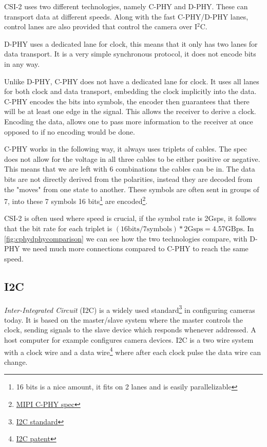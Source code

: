 CSI-2 uses two different technologies, namely C-PHY and D-PHY. These can
transport data at different speeds. Along with the fast C-PHY/D-PHY lanes,
control lanes are also provided that control the camera over I$^2$C.

D-PHY uses a dedicated lane for clock, this means that it only has two lanes for
data transport. It is a very simple synchronous protocol, it does not encode
bits in any way.

Unlike D-PHY, C-PHY does not have a dedicated lane for clock. It uses all lanes
for both clock and data transport, embedding the clock implicitly into the
data. C-PHY encodes the bits into symbols, the encoder then guarantees that
there will be at least one edge in the signal. This allows the receiver to
derive a clock. Encoding the data, allows one to pass more information to the
receiver at once opposed to if no encoding would be done.

C-PHY works in the following way, it always uses triplets of cables. The spec
does not allow for the voltage in all three cables to be either positive or
negative. This means that we are left with 6 combinations the cables can be in.
The data bits are not directly derived from the polarities, instead they are
decoded from the "moves" from one state to another. These symbols are often
sent in groups of 7, into these 7 symbols 16 bits\footnote{16 bits is a nice
amount, it fits on 2 lanes and is easily parallelizable} are encoded\footnote{\href{https://www.mipi.org/specifications/c-phy}{MIPI C-PHY spec}}.

CSI-2 is often used where speed is crucial, if the symbol rate is 2Gsps,
it follows that the bit rate for each triplet is
$(16\text{bits} / 7\text{symbols}) * 2\text{Gsps} = 4.57 \text{GBps}$.
In \cref{fig:cphydphycomparison} we can see how the two technologies compare,
with D-PHY we need much more connections compared to C-PHY to reach the same
speed.

\subsection{I2C}
\textit{Inter-Integrated Circuit} (I2C) is a widely used standard\footnote{\href{https://web.archive.org/web/20221006073143/http://www.nxp.com/docs/en/user-guide/UM10204.pdf}{I2C standard}}
in configuring cameras today. It is based on the
master/slave system where the master controls the clock, sending signals to the
slave device which responds whenever addressed. A host computer for example
configures camera devices. I2C is a two wire system with a clock wire and a
data wire\footnote{\href{https://patents.google.com/patent/US4689740A/en}{I2C patent}}
where after each clock pulse the data wire can change.

